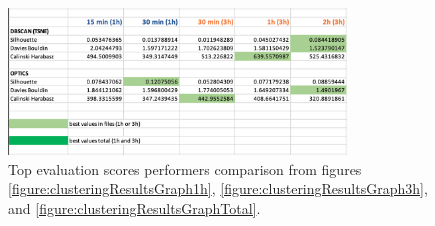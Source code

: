 


\begin{figure}
  \centering
  \includegraphics[width=0.8\textwidth]{./images/clusteringResults/clusteringResults8.png}
  \caption{Top evaluation scores performers comparison from figures \ref{figure:clusteringResultsGraph1h}, \ref{figure:clusteringResultsGraph3h}, and \ref{figure:clusteringResultsGraphTotal}.}
  \label{figure:clusteringResults8}
\end{figure}

